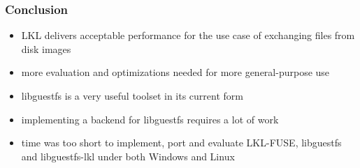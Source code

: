 

\begin{frame}

\frametitle{Conclusion}
\begin{itemize}
    \item LKL delivers acceptable performance for the use case of exchanging files from disk images
    \item more evaluation and optimizations needed for more general-purpose use
    \item libguestfs is a very useful toolset in its current form
    \item implementing a backend for libguestfs requires a lot of work
    \item time was too short to implement, port and evaluate LKL-FUSE, libguestfs and libguestfs-lkl under both Windows and Linux
\end{itemize}



\end{frame}
